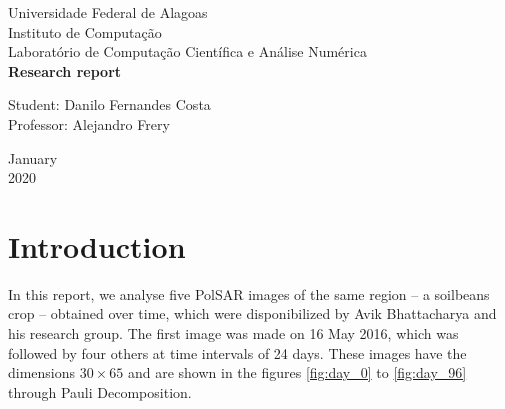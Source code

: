 \documentclass[12pt]{article}
\begin{document}

\begin{titlepage}
\begin{center}

\Huge{Universidade Federal de Alagoas}\\
\large{Instituto de Computação}\\ 
\large{Laboratório de Computação Científica e Análise Numérica}\\ 
\vspace{220pt}
\textbf{\LARGE{Research report}}\\
\vspace{3,5cm}
\end{center}

\begin{flushleft}
\begin{tabbing}
Student: Danilo Fernandes Costa\\
Professor: Alejandro Frery\\
\end{tabbing}
\end{flushleft}
\vspace{1cm}

\begin{center}
\vspace{\fill}
January\\
2020
\end{center}
\end{titlepage}

\section{Introduction}

In this report, we analyse five PolSAR images of the same region -- a soilbeans crop -- obtained over time, which were disponibilized by Avik Bhattacharya and his research group. The first image was made on 16 May 2016, which was followed by four others at time intervals of 24 days. These images have the dimensions $30 \times 65$ and are shown in the figures \ref{fig:day_0} to \ref{fig:day_96} through Pauli Decomposition. 
\end{document}

